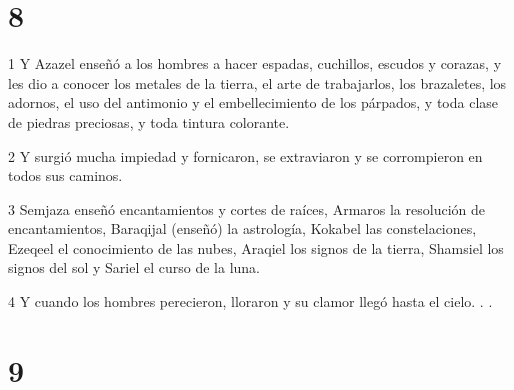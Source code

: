 \chapter{8}

\par 1 Y Azazel enseñó a los hombres a hacer espadas, cuchillos, escudos y corazas, y les dio a conocer los metales de la tierra, el arte de trabajarlos, los brazaletes, los adornos, el uso del antimonio y el embellecimiento de los párpados, y toda clase de piedras preciosas, y toda tintura colorante.
\par 2 Y surgió mucha impiedad y fornicaron, se extraviaron y se corrompieron en todos sus caminos.
\par 3 Semjaza enseñó encantamientos y cortes de raíces, Armaros la resolución de encantamientos, Baraqijal (enseñó) la astrología, Kokabel las constelaciones, Ezeqeel el conocimiento de las nubes, Araqiel los signos de la tierra, Shamsiel los signos del sol y Sariel el curso de la luna.
\par 4 Y cuando los hombres perecieron, lloraron y su clamor llegó hasta el cielo. . .

\chapter{9}


